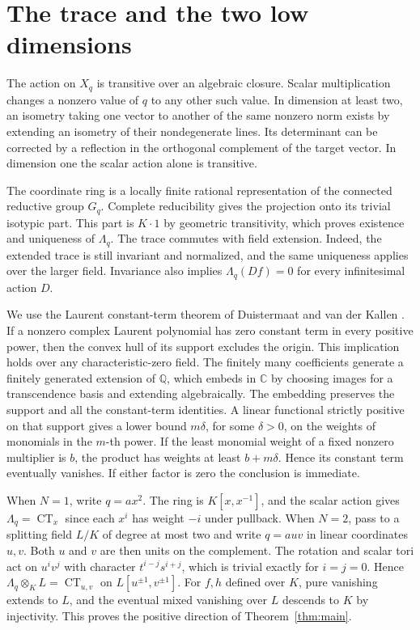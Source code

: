 \documentclass[11pt]{article}
\newcommand{\CT}{\operatorname{CT}}
\newcommand{\Lq}{\Lambda_q}
\begin{document}
\section{The trace and the two low dimensions}\label{sec:positive}

The action on \(X_q\) is transitive over an algebraic closure.
Scalar multiplication changes a nonzero value of \(q\) to any other
such value. In dimension at least two, an isometry taking one vector
to another of the same nonzero norm exists by extending an isometry
of their nondegenerate lines. Its determinant can be corrected by
a reflection in the orthogonal complement of the target vector.
In dimension one the scalar action alone is transitive.

The coordinate ring is a locally finite rational representation
of the connected reductive group \(G_q\). Complete reducibility
\cite[\S12l and Thm.~22.42]{Milne} gives the projection onto its trivial
isotypic part. This part is \(K\cdot1\) by geometric transitivity,
which proves existence and uniqueness of \(\Lq\). The trace commutes
with field extension. Indeed, the extended trace is still invariant
and normalized, and the same uniqueness applies over the larger
field. Invariance also implies \(\Lq(Df)=0\) for every infinitesimal
action \(D\).

We use the Laurent constant-term theorem of Duistermaat and van der
Kallen \cite[\S\S1, 3]{DvK}. If a nonzero complex Laurent polynomial
has zero constant term in every positive power, then the convex hull
of its support excludes the origin. This implication holds over any
characteristic-zero field. The finitely many coefficients generate
a finitely generated extension of \(\mathbb Q\), which embeds in
\(\mathbb C\) by choosing images for a transcendence basis and
extending algebraically. The embedding preserves the support and
all the constant-term identities. A linear functional strictly
positive on that support gives a lower bound \(m\delta\), for some
\(\delta>0\), on the weights of monomials in the \(m\)-th power.
If the least monomial weight of a fixed nonzero multiplier is \(b\),
the product has weights at least \(b+m\delta\). Hence its constant
term eventually vanishes. If either factor is zero the conclusion is
immediate.

When \(N=1\), write \(q=ax^2\). The ring is \(K[x,x^{-1}]\), and the
scalar action gives \(\Lq=\CT_x\) since each \(x^i\) has weight \(-i\) under pullback.
When \(N=2\), pass to a splitting field \(L/K\) of degree at most two
and write \(q=a uv\) in linear coordinates \(u,v\). Both \(u\) and \(v\)
are then units on the complement. The rotation and scalar tori act
on \(u^iv^j\) with character \(t^{i-j}s^{i+j}\), which is trivial
exactly for \(i=j=0\). Hence \(\Lq\otimes_K L=\CT_{u,v}\) on
\(L[u^{\pm1},v^{\pm1}]\). For \(f,h\) defined over \(K\), pure vanishing
extends to \(L\), and the eventual mixed vanishing over \(L\) descends
to \(K\) by injectivity. This proves the positive direction of
Theorem~\ref{thm:main}.
\end{document}

